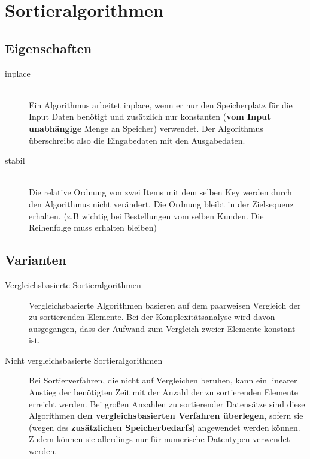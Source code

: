 \section{Sortieralgorithmen} \label{sec:sortalgorithms}
\subsection{Eigenschaften}
\begin{description}
	\item[inplace] \hfill \\
	Ein Algorithmus arbeitet inplace, wenn er nur den Speicherplatz für die Input Daten benötigt und zusätzlich nur konstanten (\textbf{vom Input unabhängige} Menge an Speicher) verwendet. Der Algorithmus überschreibt also die Eingabedaten mit den Ausgabedaten.	
	\item[stabil]  \hfill \\
	Die relative Ordnung von zwei Items mit dem selben Key werden durch den Algorithmus nicht verändert. Die Ordnung bleibt in der Zielsequenz erhalten. (z.B wichtig bei Bestellungen vom selben Kunden. Die Reihenfolge muss erhalten bleiben)
\end{description}

\subsection{Varianten}
\begin{description}
	\item[Vergleichsbasierte Sortieralgorithmen] Vergleichsbasierte Algorithmen basieren auf dem paarweisen Vergleich der zu sortierenden Elemente. Bei der Komplexitätsanalyse wird davon ausgegangen, dass der Aufwand zum Vergleich zweier Elemente konstant ist.
	\item[Nicht vergleichsbasierte Sortieralgorithmen] Bei Sortierverfahren, die nicht auf Vergleichen beruhen, kann ein linearer Anstieg der benötigten Zeit mit der Anzahl der zu sortierenden Elemente erreicht werden. Bei großen Anzahlen zu sortierender Datensätze sind diese Algorithmen \textbf{den vergleichsbasierten Verfahren überlegen}, sofern sie (wegen des \textbf{zusätzlichen Speicherbedarfs}) angewendet werden können. Zudem können sie allerdings nur für numerische Datentypen verwendet werden.
\end{description}

